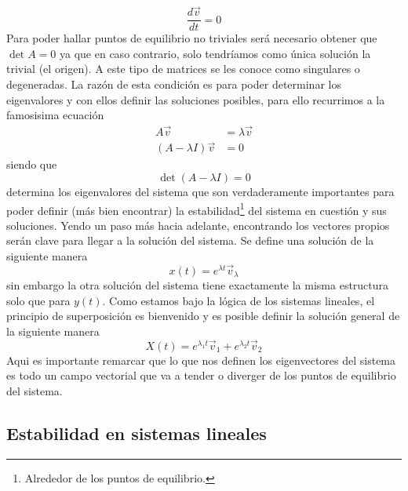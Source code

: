 \documentclass[11pt,a4paper]{article}
\begin{document}
$$\frac{d\vec{v}}{dt}=0$$
Para poder hallar puntos de equilibrio no triviales será necesario obtener que $\det A=0$ ya que en caso contrario, solo tendríamos como única solución la trivial (el origen). A este tipo de matrices se les conoce como singulares o degeneradas. La razón de esta condición es para poder determinar los eigenvalores y con ellos definir las soluciones posibles, para ello recurrimos a la famosisima ecuación
\begin{align*}
A\vec{v}&=\lambda\vec{v}\\
(A-\lambda I)\vec{v}&=0
\end{align*}
siendo que 
$$\det(A-\lambda I)=0$$
determina los eigenvalores del sistema que son verdaderamente importantes para poder definir (más bien encontrar) la estabilidad\footnote{Alrededor de los puntos de equilibrio.} del sistema en cuestión y sus soluciones. Yendo un paso más hacia adelante, encontrando los vectores propios serán clave para llegar a la solución del sistema. Se define una solución de la siguiente manera
$$x(t)=e^{\lambda t}\vec{v}_\lambda$$
sin embargo la otra solución del sistema tiene exactamente la misma estructura solo que para $y(t)$. Como estamos bajo la lógica de los sistemas lineales, el principio de superposición es bienvenido y es posible definir la solución general de la siguiente manera
\begin{equation}\label{eq:solGral}
X(t)=e^{\lambda_1 t}\vec{v}_1+e^{\lambda_2 t}\vec{v}_2
\end{equation}
Aqui es importante remarcar que lo que nos definen los eigenvectores del sistema es todo un campo vectorial que va a tender o diverger de los puntos de equilibrio del sistema.

\subsection{Estabilidad en sistemas lineales}
\end{document}
